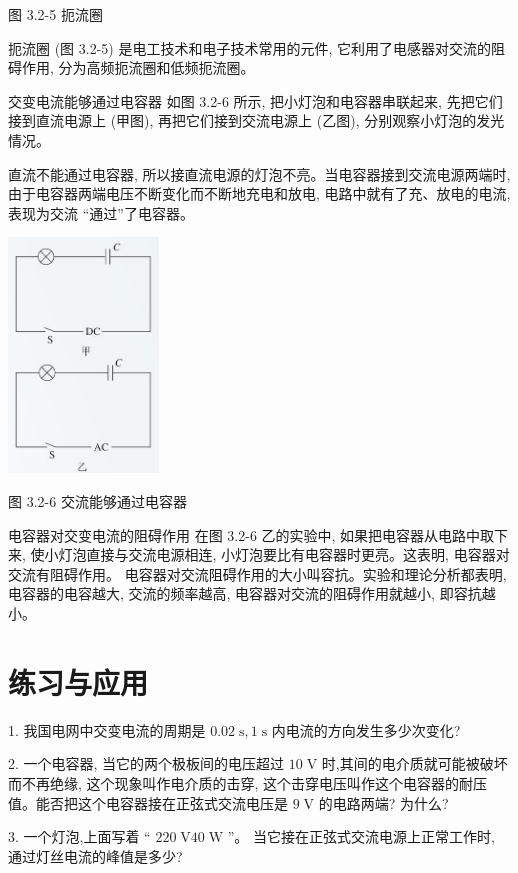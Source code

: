 \documentclass[10pt]{article}
\begin{document}
图 3.2-5 扼流圈

扼流圈 (图 3.2-5) 是电工技术和电子技术常用的元件, 它利用了电感器对交流的阻碍作用, 分为高频扼流圈和低频扼流圈。

交变电流能够通过电容器 如图 3.2-6 所示, 把小灯泡和电容器串联起来, 先把它们接到直流电源上 (甲图), 再把它们接到交流电源上 (乙图), 分别观察小灯泡的发光情况。

直流不能通过电容器, 所以接直流电源的灯泡不亮。当电容器接到交流电源两端时, 由于电容器两端电压不断变化而不断地充电和放电, 电路中就有了充、放电的电流, 表现为交流 “通过”了电容器。

\begin{center}
\includegraphics[max width=0.3\textwidth]{images/01910e72-c5b7-7ed5-a6d4-fb3a5faefc32_62_288985.jpg}
\end{center}

图 3.2-6 交流能够通过电容器

电容器对交变电流的阻碍作用 在图 3.2-6 乙的实验中, 如果把电容器从电路中取下来, 使小灯泡直接与交流电源相连, 小灯泡要比有电容器时更亮。这表明, 电容器对交流有阻碍作用。 电容器对交流阻碍作用的大小叫容抗。实验和理论分析都表明, 电容器的电容越大, 交流的频率越高, 电容器对交流的阻碍作用就越小, 即容抗越小。

\section*{练习与应用}

1. 我国电网中交变电流的周期是 \({0.02}\mathrm{\;s},1\mathrm{\;s}\) 内电流的方向发生多少次变化?

2. 一个电容器, 当它的两个极板间的电压超过 \({10}\mathrm{\;V}\) 时,其间的电介质就可能被破坏而不再绝缘, 这个现象叫作电介质的击穿, 这个击穿电压叫作这个电容器的耐压值。能否把这个电容器接在正弦式交流电压是 \(9\mathrm{\;V}\) 的电路两端? 为什么?

3. 一个灯泡,上面写着 “ \({220}\mathrm{\;V}{40}\mathrm{\;W}\) ”。 当它接在正弦式交流电源上正常工作时, 通过灯丝电流的峰值是多少?
\end{document}
